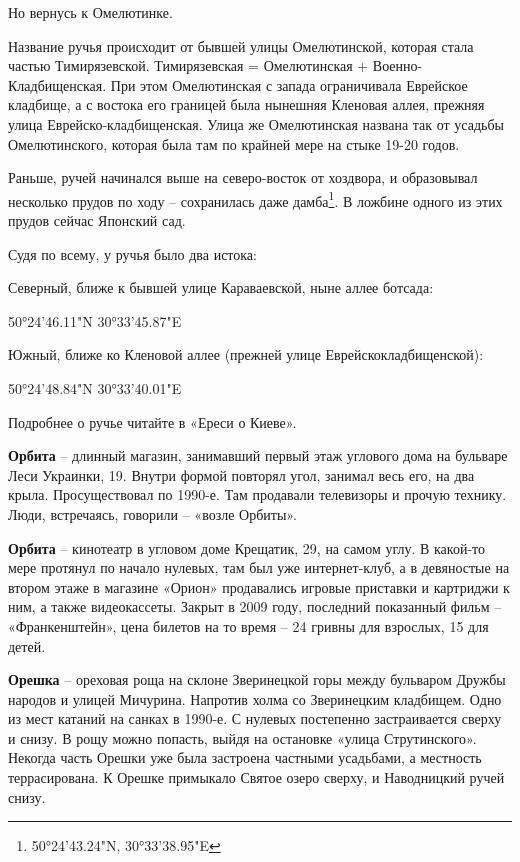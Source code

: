 Но вернусь к Омелютинке.

Название ручья происходит от бывшей улицы Омелютинской, которая стала частью Тимирязевской. Тимирязевская = Омелютинская + Военно-Кладбищенская. При этом Омелютинская с запада ограничивала Еврейское кладбище, а с востока его границей была нынешняя Кленовая аллея, прежняя улица Еврейско-кладбищенская. Улица же Омелютинская названа так от усадьбы Омелютинского, которая была там по крайней мере на стыке 19-20 годов.

Раньше, ручей начинался выше на северо-восток от хоздвора, и образовывал несколько прудов по ходу – сохранилась даже дамба\footnote{50°24'43.24"N,  30°33'38.95"E}. В ложбине одного из этих прудов сейчас Японский сад.

Судя по всему, у ручья было два истока:

Северный, ближе к бывшей улице Караваевской, ныне аллее ботсада: 

50°24'46.11"N 30°33'45.87"E

Южный, ближе ко Кленовой аллее (прежней улице Еврейскокладбищенской):

50°24'48.84"N 30°33'40.01"E

Подробнее о ручье читайте в «Ереси о Киеве».\\

\medskip


\textbf{Орбита} – длинный магазин, занимавший первый этаж углового дома на бульваре Леси Украинки, 19. Внутри формой повторял угол, занимал весь его, на два крыла. Просуществовал по 1990-е. Там продавали телевизоры и прочую технику. Люди, встречаясь, говорили – «возле Орбиты».\\

\medskip


\textbf{Орбита} – кинотеатр в угловом доме Крещатик, 29, на самом углу. В какой-то мере протянул по начало нулевых, там был уже интернет-клуб, а в девяностые на втором этаже в магазине «Орион» продавались игровые приставки и картриджи к ним, а также видеокассеты. Закрыт в 2009 году, последний показанный фильм – «Франкенштейн», цена билетов на то время – 24 гривны для взрослых, 15 для детей.\\

\medskip

\textbf{Орешка} – ореховая роща на склоне Зверинецкой горы между бульваром Дружбы народов и улицей Мичурина. Напротив холма со Зверинецким кладбищем. Одно из мест катаний на санках в 1990-е. С нулевых постепенно застраивается сверху и снизу. В рощу можно попасть, выйдя на остановке «улица Струтинского». Некогда часть Орешки уже была застроена частными усадьбами, а местность террасирована. К Орешке примыкало Святое озеро сверху, и Наводницкий ручей снизу.\\

